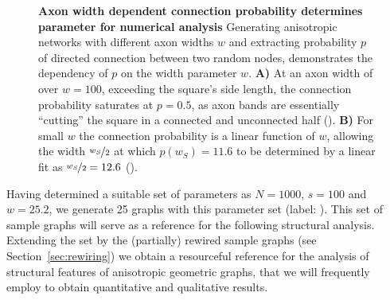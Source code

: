 \begin{figure}[htp]
  \centering
  \vspace{-0.15cm}
  \caption{\textbf{Axon width dependent connection probability
      determines parameter for numerical analysis} Generating
    anisotropic networks with different axon widths $w$ and extracting
    probability $p$ of directed connection between two random nodes,
    demonstrates the dependency of $p$ on the width parameter $w$.
    \textbf{A)} At an axon width of over $w=100$, exceeding the
    square's side length, the connection probability saturates at
    $p=0.5$, as axon bands are essentially \enquote{cutting} the
    square in a connected and unconnected half
    (). \textbf{B)} For small $w$ the connection
    probability is a linear function of $w$, allowing the width $\nicefrac{w_S}{2}$
    at which $p(w_S)=11.6$ to be determined by a linear fit as
    $\nicefrac{w_S}{2} =
    12.6$ ().} %
  \label{fig:determine_axon_width}
\end{figure}



\label{sample_graphs}Having determined a suitable set of parameters as
$N=1000$, $s=100$ and $w=25.2$, we generate 25 graphs with this parameter
set (label: ).
This set of sample graphs will serve as a reference for the following
structural analysis. Extending the set by the (partially) rewired
sample graphs (see Section~\ref{sec:rewiring}) we obtain a resourceful
reference for the analysis of structural features of anisotropic
geometric graphs, that we will frequently employ to obtain
quantitative and qualitative results.













